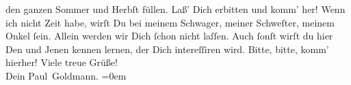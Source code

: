 \begin{ledgroupsized}[t]{13cm}
               den ganzen Sommer und Herbſt füllen. Laß’ Dich erbitten und komm’ her! Wenn ich nicht
               Zeit habe, wirſt Du bei meinem Schwager, meiner Schweſter, meinem Onkel ſein. Allein werden wir Dich ſchon nicht laſſen. Auch ſonſt wirſt du
               hier Den und Jenen kennen lernen, der Dich  intereſſiren wird. Bitte, bitte, komm’ hierher!\pend
           \pstart
           Viele treue Grüße! {\\[\baselineskip]}Dein \spacefill\mbox{Paul Goldmann.}\pend
           \leftskip=0em{}
         
         \endnumbering{}\end{ledgroupsized}  \newcommand{\dateiname}{L02873}\newcommand{\titel}{Paul Goldmann an Arthur Schnitzler, 29. 4. 1899}\newcommand{\editorInnen}{Martin Anton Müller und Laura Untner}
      